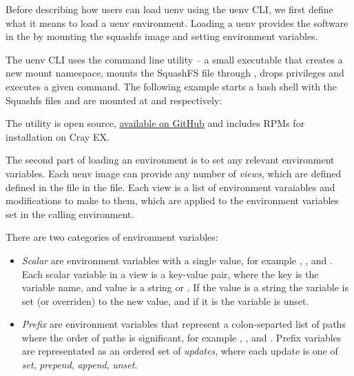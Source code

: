
Before describing how users can load uenv using the uenv CLI, we first define what it means to load a uenv environment.
Loading a uenv provides the software in the \squashfs by mounting the squashfs image and setting environment variables.

The uenv CLI uses the  command line utility -- a small  executable that creates a new mount namespace, mounts the SquashFS file through , drops privileges and executes a given command.
The following example starts a bash shell with the Squashfs files  and  are mounted at  and  respectively:

The utility is open source, \href{https://github.com/eth-cscs/squashfs-mount}{available on GitHub} and includes RPMs for installation on Cray EX.

The second part of loading an environment is to set any relevant environment variables.
Each uenv image can provide any number of \emph{views}, which are defined defined in the  file in the \squashfs file.
Each view is a list of environment varaiables and modifications to make to them, which are applied to the environment variables set in the calling environment.

There are two categories of environment variables:
\begin{itemize}
    \item \emph{Scalar} are environment variables with a single value, for example , , and .
        Each scalar variable in a view is a key-value pair, where the key is the variable name, and value is a string or .
        If the value is a string the variable is set (or overriden) to the new value, and if it is  the variable is unset.
    \item \emph{Prefix} are environment variables that represent a colon-separted list of paths where the order of paths is significant, for example , , and .
        Prefix variables are representated as an ordered set of \emph{updates}, where each update is one of \emph{set}, \emph{prepend}, \emph{append}, \emph{unset}.
\end{itemize}

